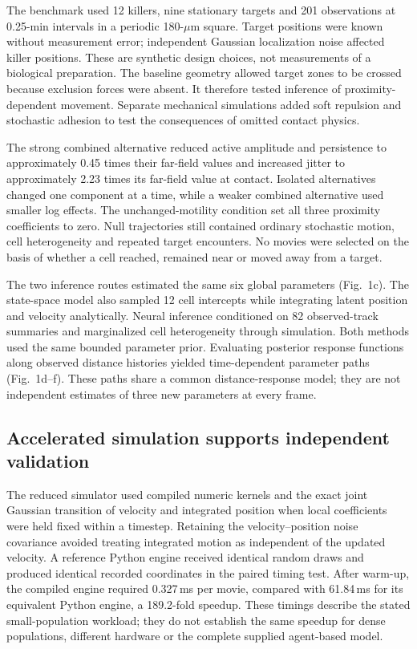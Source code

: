 \documentclass[12pt]{article}
\begin{document}
The benchmark used 12 killers, nine stationary targets and 201 observations at 0.25-min intervals in a periodic 180-$\mu$m square. Target positions were known without measurement error; independent Gaussian localization noise affected killer positions. These are synthetic design choices, not measurements of a biological preparation. The baseline geometry allowed target zones to be crossed because exclusion forces were absent. It therefore tested inference of proximity-dependent movement. Separate mechanical simulations added soft repulsion and stochastic adhesion to test the consequences of omitted contact physics.

The strong combined alternative reduced active amplitude and persistence to approximately 0.45 times their far-field values and increased jitter to approximately 2.23 times its far-field value at contact. Isolated alternatives changed one component at a time, while a weaker combined alternative used smaller log effects. The unchanged-motility condition set all three proximity coefficients to zero. Null trajectories still contained ordinary stochastic motion, cell heterogeneity and repeated target encounters. No movies were selected on the basis of whether a cell reached, remained near or moved away from a target.

The two inference routes estimated the same six global parameters (Fig.~1c). The state-space model also sampled 12 cell intercepts while integrating latent position and velocity analytically. Neural inference conditioned on 82 observed-track summaries and marginalized cell heterogeneity through simulation. Both methods used the same bounded parameter prior. Evaluating posterior response functions along observed distance histories yielded time-dependent parameter paths (Fig.~1d--f). These paths share a common distance-response model; they are not independent estimates of three new parameters at every frame.

\subsection*{Accelerated simulation supports independent validation}
The reduced simulator used compiled numeric kernels and the exact joint Gaussian transition of velocity and integrated position when local coefficients were held fixed within a timestep. Retaining the velocity--position noise covariance avoided treating integrated motion as independent of the updated velocity. A reference Python engine received identical random draws and produced identical recorded coordinates in the paired timing test. After warm-up, the compiled engine required 0.327\,ms per movie, compared with 61.84\,ms for its equivalent Python engine, a 189.2-fold speedup. These timings describe the stated small-population workload; they do not establish the same speedup for dense populations, different hardware or the complete supplied agent-based model.
\end{document}
